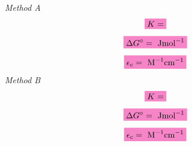 \noindent \textit{Method A}
\begin{equation*}
    \mathcolorbox{Lavender}{K = }
\end{equation*}
\begin{equation*}
    \mathcolorbox{Lavender}{\Delta G^{\circ} =  \text{ Jmol}^{-1}}
\end{equation*}
\begin{equation*}
    \mathcolorbox{Lavender}{\epsilon_c = \text{ M}^{-1}\text{cm} ^ {-1}}
\end{equation*}
\textit{Method B}
\begin{equation*}
    \mathcolorbox{Lavender}{K = }
\end{equation*}
\begin{equation*}
    \mathcolorbox{Lavender}{\Delta G^{\circ} =  \text{ Jmol}^{-1}}
\end{equation*}
\begin{equation*}
    \mathcolorbox{Lavender}{\epsilon_c = \text{ M}^{-1}\text{cm} ^ {-1}}
\end{equation*}